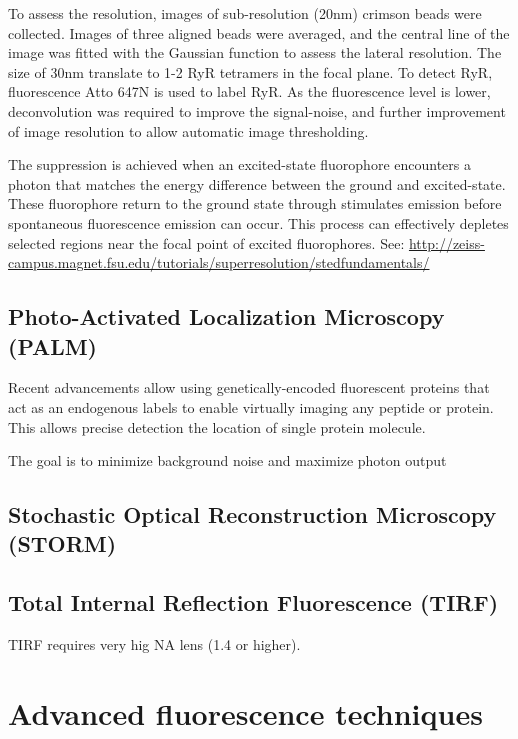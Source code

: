 To assess the resolution, images of sub-resolution (20nm) crimson beads were
collected. Images of three aligned beads were averaged, and the central line of
the image was fitted with the Gaussian function to assess the lateral
resolution. The size of 30nm translate to 1-2 RyR tetramers in the focal
plane. To detect RyR, fluorescence Atto 647N is used to label RyR. As the
fluorescence level is lower, deconvolution was required to improve the
signal-noise, and further improvement of image resolution to allow automatic
image thresholding.

The suppression is achieved when an excited-state fluorophore encounters a
photon that matches the energy difference between the ground and excited-state.
These fluorophore return to the ground state through stimulates emission before
spontaneous fluorescence emission can occur. This process can effectively
depletes selected regions near the focal point of excited fluorophores. See:
\url{http://zeiss-campus.magnet.fsu.edu/tutorials/superresolution/stedfundamentals/}

\subsection{Photo-Activated Localization Microscopy (PALM)}
\label{sec:PALM}

Recent advancements allow using genetically-encoded fluorescent proteins that
act as an endogenous labels to enable virtually imaging any peptide or protein.
This allows precise detection the location of single protein molecule.


The goal is to minimize background noise and maximize photon output 



\subsection{Stochastic Optical Reconstruction Microscopy (STORM)}

\subsection{Total Internal Reflection Fluorescence (TIRF)}

TIRF requires very hig NA lens (1.4 or higher).

\section{Advanced fluorescence techniques}


